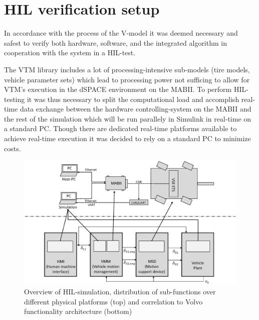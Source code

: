 \documentclass[root.tex]{subfiles}
\begin{document}
{\pagestyle{empty}}
\section{\gls{HIL} verification setup}
\label{chap:HiL-Architecture}


In accordance with the process of the V-model\cite{automotive_software_engineering} it was deemed necessary and safest to verify both hardware, software, and the integrated algorithm in cooperation with the system in a \gls{HIL}-test. 

The \gls{VTM} library includes a lot of processing-intensive sub-models (tire models, vehicle parameter sets) which lead to processing power not sufficing to allow for \gls{VTM}'s execution in the dSPACE environment on the \gls{MABII}. To perform \gls{HIL}-testing it was thus necessary to split the computational load and accomplish real-time data exchange between the hardware controlling-system on the \gls{MABII} and the rest of the simulation which will be run parallely in Simulink in real-time on a standard PC. Though there are dedicated real-time platforms available to achieve real-time execution it was decided to rely on a standard PC to minimize costs.%

\begin{figure}[htb]
	\centering
	\includegraphics[width=0.9\linewidth]{HIL_overview}
	\caption[Overview of \acrlong{HIL}-simulation, distribution of sub-functions over different physical platforms (top) and correlation to Volvo functionality architecture (bottom)]{Overview of \gls{HIL}-simulation, distribution of sub-functions over different physical platforms (top) and correlation to Volvo functionality architecture (bottom)}
	
	\label{fig:HIL_overview}
\end{figure}
\end{document}
